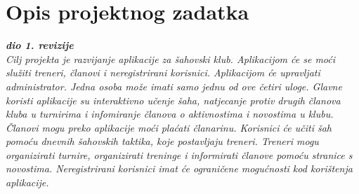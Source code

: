 \chapter{Opis projektnog zadatka}
		
		\textbf{\textit{dio 1. revizije}}\\
		
		\textit{ Cilj projekta je razvijanje aplikacije za šahovski klub. Aplikacijom će
			se moći služiti treneri, članovi i neregistrirani korisnici. Aplikacijom
			će upravljati administrator. Jedna osoba može imati samo jednu od ove
			četiri uloge. Glavne koristi aplikacije su interaktivno učenje šaha,
			natjecanje protiv drugih članova kluba u turnirima i infomiranje članova
			o aktivnostima i novostima u klubu. Članovi mogu preko aplikacije moći
			plaćati članarinu. Korisnici će učiti šah pomoću dnevnih šahovskih
			taktika, koje postavljaju treneri. Treneri mogu organizirati turnire,
			organizirati treninge i informirati članove pomoću stranice s novostima.
			Neregistrirani korisnici imat će ograničene mogućnosti kod korištenja
			aplikacije.}
